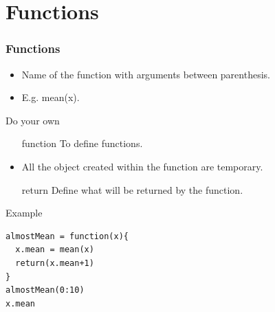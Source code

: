 \documentclass[10pt]{beamer}
\newenvironment{xframe}[2][]
  {\begin{frame}[fragile,environment=xframe,#1]
  \frametitle{#2}}
  {\end{frame}}
\begin{document}
\section{Functions}

\begin{xframe}{Functions}
  \begin{block}{}
    \begin{itemize}
    \item Name of the function with arguments between parenthesis.
    \item E.g. {\sf mean(x)}.
    \end{itemize}
  \end{block}
  \begin{block}{Do your own}
    \begin{itemize}
      \item[function] To define functions.
      \item All the object created within the function are temporary.
      \item[return] Define what will be returned by the function. 
    \end{itemize}
  \end{block}
  \begin{exampleblock}{Example}
\begin{verbatim}
almostMean = function(x){
  x.mean = mean(x)
  return(x.mean+1)
}
almostMean(0:10)
x.mean
\end{verbatim}
  \end{exampleblock}
\end{xframe}



\end{document}
